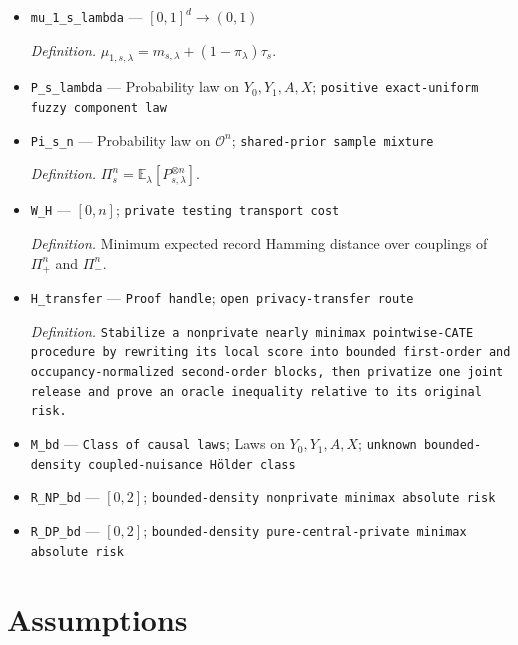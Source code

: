 \documentclass{article}
\begin{document}
\begin{itemize}
  \par\smallskip\noindent\emph{Definition.} \(\mu_{0,s,\lambda}=m_{s,\lambda}-\pi_\lambda\tau_s\).
  \item \texttt{mu\_\allowbreak{}1\_\allowbreak{}s\_\allowbreak{}lambda} --- \([0,1]^d\to(0,1)\)
  \par\smallskip\noindent\emph{Definition.} \(\mu_{1,s,\lambda}=m_{s,\lambda}+(1-\pi_\lambda)\tau_s\).
  \item \texttt{P\_\allowbreak{}s\_\allowbreak{}lambda} --- Probability law on \(Y_0,Y_1,A,X\); \texttt{positive exact-\allowbreak{}uniform fuzzy component law}
  \item \texttt{Pi\_\allowbreak{}s\_\allowbreak{}n} --- Probability law on \(\mathcal O^n\); \texttt{shared-\allowbreak{}prior sample mixture}
  \par\smallskip\noindent\emph{Definition.} \(\Pi_s^n=\mathbb E_\lambda[P_{s,\lambda}^{\otimes n}]\).
  \item \texttt{W\_\allowbreak{}H} --- \([0,n]\); \texttt{private testing transport cost}
  \par\smallskip\noindent\emph{Definition.} Minimum expected record Hamming distance over couplings of \(\Pi_+^n\) and \(\Pi_-^n\).
  \item \texttt{H\_\allowbreak{}transfer} --- \texttt{Proof handle}; \texttt{open privacy-\allowbreak{}transfer route}
  \par\smallskip\noindent\emph{Definition.} \texttt{Stabilize a nonprivate nearly minimax pointwise-\allowbreak{}CATE procedure by rewriting its local score into bounded first-\allowbreak{}order and occupancy-\allowbreak{}normalized second-\allowbreak{}order blocks,\allowbreak{} then privatize one joint release and prove an oracle inequality relative to its original risk.}
  \item \texttt{M\_\allowbreak{}bd} --- \texttt{Class of causal laws}; Laws on \(Y_0,Y_1,A,X\); \texttt{unknown bounded-\allowbreak{}density coupled-\allowbreak{}nuisance Hölder class}
  \item \texttt{R\_\allowbreak{}NP\_\allowbreak{}bd} --- \([0,2]\); \texttt{bounded-\allowbreak{}density nonprivate minimax absolute risk}
  \item \texttt{R\_\allowbreak{}DP\_\allowbreak{}bd} --- \([0,2]\); \texttt{bounded-\allowbreak{}density pure-\allowbreak{}central-\allowbreak{}private minimax absolute risk}
\end{itemize}

\section{Assumptions}
\end{document}
